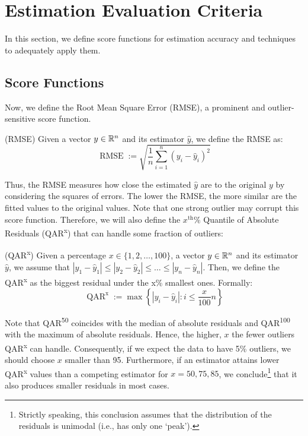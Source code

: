 \section{Estimation Evaluation Criteria}{ \label{sec:general_methods}
	In this section, we define score functions for estimation accuracy and techniques to adequately apply them. 

	\subsection{Score Functions}\label{sec:scorefun}
	    Now, we define the Root Mean Square Error (RMSE), a prominent and outlier-sensitive score function.
	    \begin{definition}(RMSE)\label{def:rmse}
		Given a vector $y\in \mathbb{R}^n$ and its estimator $\hat y$, we define the RMSE as:
		\begin{equation}
			\label{eq:rmse}
			 \operatorname{RMSE}:=\sqrt{\frac{1}{n}\sum_{i=1}^n (y_i - \hat y_i)^2}
		\end{equation}
		\end{definition}
		Thus, the RMSE measures how close the estimated $\hat y$ are to the original $y$ by considering the squares of errors. The lower the RMSE, the more similar are the fitted values to the original values. Note that one strong outlier may corrupt this score function. Therefore, we will also define the $x^\text{th}\%$ Quantile of Absolute Residuals (QAR\textsuperscript{x}) that can handle some fraction of outliers:
		\begin{definition} (QAR\textsuperscript{x}) \label{def:qar}
		    Given a percentage $x\in \{1,2,\dots,100\}$, a vector $y\in \mathbb{R}^n$ and its estimator $\hat y$, we assume that $|y_1-\hat y_1|\leq |y_2-\hat y_2|\leq \dots \leq |y_n-\hat y_n|$. Then, we define the QAR\textsuperscript{x} as the biggest residual under the x\% smallest ones. Formally:  
		    \begin{equation}
		        \operatorname{QAR}^{\text{x}}:=\max \left\{|y_i-\hat y_i|:i\leq \frac{x}{100}n \right\}
		    \end{equation}
		\end{definition}
		Note that QAR\textsuperscript{50} coincides with the median of absolute residuals and QAR\textsuperscript{100} with the maximum of absolute residuals. Hence, the higher, $x$ the fewer outliers QAR\textsuperscript{x} can handle. Consequently, if we expect the data to have 5\% outliers, we should choose $x$ smaller than 95. Furthermore, if an estimator attains lower QAR\textsuperscript{x} values than a competing estimator for $x=50,75,85$, we conclude\footnote{Strictly speaking, this conclusion assumes that the distribution of the residuals is unimodal (i.e., has only one `peak').} that it also produces smaller residuals in most cases.  
		
}
